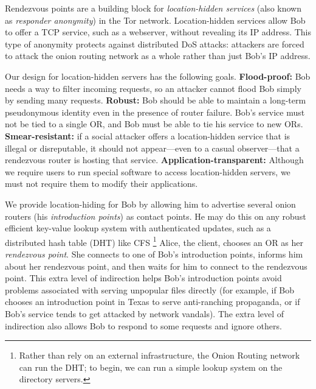 \documentclass[times,10pt,twocolumn]{article}
\begin{document}
\label{sec:rendezvous}

Rendezvous points are a building block for \emph{location-hidden
services} (also known as \emph{responder anonymity}) in the Tor
network.  Location-hidden services allow Bob to offer a TCP
service, such as a webserver, without revealing its IP address.
This type of anonymity protects against distributed DoS attacks:
attackers are forced to attack the onion routing network as a whole
rather than just Bob's IP address.

Our design for location-hidden servers has the following goals.
\textbf{Flood-proof:} Bob needs a way to filter incoming requests,
so an attacker cannot flood Bob simply by sending many requests.
\textbf{Robust:} Bob should be able to maintain a long-term pseudonymous
identity even in the presence of router failure. Bob's service must
not be tied to a single OR, and Bob must be able to tie his service
to new ORs. \textbf{Smear-resistant:} if a social attacker offers a
location-hidden service that is illegal or disreputable, it should not
appear---even to a casual observer---that a rendezvous router is hosting
that service. \textbf{Application-transparent:} Although we require users
to run special software to access location-hidden servers, we must not
require them to modify their applications.

We provide location-hiding for Bob by allowing him to advertise
several onion routers (his \emph{introduction points}) as contact
points. He may do this on any robust efficient
key-value lookup system with authenticated updates, such as a
distributed hash table (DHT) like CFS \cite{cfs:sosp01}\footnote{
Rather than rely on an external infrastructure, the Onion Routing network
can run the DHT; to begin, we can run a simple lookup system on the
directory servers.} Alice, the client, chooses an OR as her
\emph{rendezvous point}. She connects to one of Bob's introduction
points, informs him about her rendezvous point, and then waits for him
to connect to the rendezvous point. This extra level of indirection
helps Bob's introduction points avoid problems associated with serving
unpopular files directly (for example, if Bob chooses
an introduction point in Texas to serve anti-ranching propaganda,
or if Bob's service tends to get attacked by network vandals).
The extra level of indirection also allows Bob to respond to some requests
and ignore others.
\end{document}
